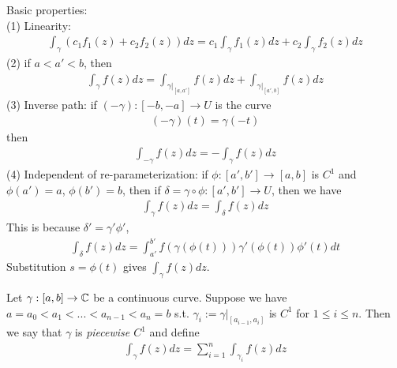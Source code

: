 \documentclass[a4paper]{article}
\begin{document}
Basic properties:\\
(1) Linearity:
\begin{equation*}
\begin{aligned}
\int_\gamma (c_1 f_1(z) + c_2 f_2(z)) dz = c_1 \int_\gamma f_1(z)dz + c_2\int_\gamma f_2(z) dz
\end{aligned}
\end{equation*}
(2) if $a < a' < b$, then
\begin{equation*}
\begin{aligned}
\int_\gamma f(z) dz = \int_{\gamma|_{[a,a']}} f(z) dz + \int_{\gamma|_{[a',b]}} f(z) dz
\end{aligned}
\end{equation*}
(3) Inverse path: if $(-\gamma):[-b,-a] \to U$ is the curve
\begin{equation*}
\begin{aligned}
(-\gamma)(t) = \gamma(-t)
\end{aligned}
\end{equation*}
then
\begin{equation*}
\begin{aligned}
\int_{-\gamma} f(z) dz = -\int_\gamma f(z) dz
\end{aligned}
\end{equation*}
(4) Independent of re-parameterization: if $\phi:[a',b'] \to [a,b]$ is $C^1$ and $\phi(a')=a$, $\phi(b') = b$, then if $\delta = \gamma \circ \phi: [a',b'] \to U$, then we have
\begin{equation*}
\begin{aligned}
\int_\gamma f(z) dz = \int_\delta f(z) dz
\end{aligned}
\end{equation*}
This is because $\delta' = \gamma' \phi'$,
\begin{equation*}
\begin{aligned}
\int_\delta f(z) dz = \int_{a'}^{b'} f(\gamma(\phi(t)))\gamma'(\phi(t))\phi'(t) dt
\end{aligned}
\end{equation*}
Substitution $s=\phi(t)$ gives $\int_\gamma f(z) dz$.

Let $\gamma: [a,b] \to \mathbb{C}$ be a continuous curve. Suppose we have $a=a_0<a_1<...<a_{n-1}<a_n = b$ s.t. $\gamma_i := \gamma|_{[a_{i-1},a_i]}$ is $C^1$ for $1\leq i \leq n$. Then we say that $\gamma$ is \emph{piecewise $C^1$} and define
\begin{equation*}
\begin{aligned}
\int_\gamma f(z) dz = \sum_{i=1}^n \int_{\gamma_i}f(z) dz
\end{aligned}
\end{equation*}
\end{document}
